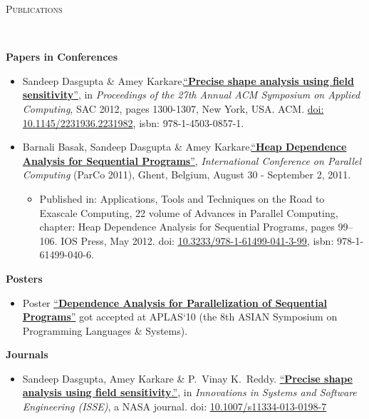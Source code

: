 \documentclass[9pt]{article}
\newenvironment{changemargin}[2]{%
  \begin{list}{}{%
    \setlength{\topsep}{0pt}%
    \setlength{\leftmargin}{#1}%
    \setlength{\rightmargin}{#2}%
    \setlength{\listparindent}{\parindent}%
    \setlength{\itemindent}{\parindent}%
    \setlength{\parsep}{\parskip}%
  }%
  \item[]}{\end{list}
}
\newcommand{\lineover}{
	\begin{changemargin}{-0.05in}{-0.05in}
		\vspace*{-8pt}
		\hrulefill \\
		\vspace*{-2pt}
	\end{changemargin}
}
\newcommand{\header}[1]{
	\begin{changemargin}{-0.5in}{-0.5in}
		\scshape{#1}\\
  	\lineover
	\end{changemargin}
}
\newenvironment{body} {
	\vspace*{-16pt}
	\begin{changemargin}{-0.25in}{-0.5in}
  }	
	{\end{changemargin}
}
\begin{document}
\header{Publications}
\begin{body}
\vspace{14pt}
\textbf{Papers in Conferences}\\
	\vspace*{-4pt}
	\begin{itemize} \itemsep -0pt
		\item Sandeep Dasgupta \& Amey Karkare.\href{https://dl.dropbox.com/u/86719354/sac\_2012.pdf}{``\textbf{Precise shape analysis using field sensitivity}''}, in \emph{Proceedings of the 27th Annual ACM Symposium on Applied Computing}, SAC 2012, pages 1300-1307, New York, USA. ACM. \href{http://dx.doi.org/10.1145/2245276.2231982}{doi: 10.1145/2231936.2231982}, isbn: 978-1-4503-0857-1. \\
		\item Barnali Basak, Sandeep Dasgupta \& Amey Karkare.\href{https://dl.dropbox.com/u/86719354/parco\_2011.pdf}{``\textbf{Heap Dependence Analysis for Sequential Programs}''}, \emph{International Conference on Parallel Computing} (ParCo 2011), Ghent, Belgium, August 30 - September 2, 2011. \\
		\begin{itemize} \itemsep -0pt
			\item Published in: Applications, Tools and Techniques on the Road to Exascale Computing, 22 volume of Advances in 
				Parallel Computing, chapter: Heap Dependence Analysis for Sequential Programs, pages 99--106. IOS Press, May 2012. 
				doi: \href{http://dx.doi.org/10.3233/978-1-61499-041-3-99}{10.3233/978-1-61499-041-3-99}, isbn: 978-1-61499-040-6.
		\end{itemize}
	\end{itemize}

\textbf{Posters}\\
	\vspace*{-4pt}
	\begin{itemize} \itemsep -0pt
		\item Poster \href{https://dl.dropbox.com/u/86719354/poster_APLAS2010.pdf}{``\textbf{Dependence Analysis for Parallelization 
		of Sequential Programs}''} got accepted at APLAS`10 (the 8th ASIAN Symposium on Programming Languages \& Systems).
	\end{itemize}

\textbf{Journals}\\
	\vspace{-4pt}
	\begin{itemize} \itemsep -0pt
		\item  Sandeep Dasgupta, Amey Karkare \& P.\ Vinay K.\ Reddy. \href{https://dl.dropbox.com/u/86719354/publication_isse.pdf}{``\textbf{Precise shape analysis using field sensitivity}.''}, in \emph{Innovations in Systems and Software Engineering (ISSE)}, a NASA journal.
                 doi: \href{http://www.springerlink.com/openurl.asp?genre=article&id=doi:10.1007/s11334-013-0198-7}{10.1007/s11334-013-0198-7} 
	\end{itemize}
\end{body}
\end{document}

